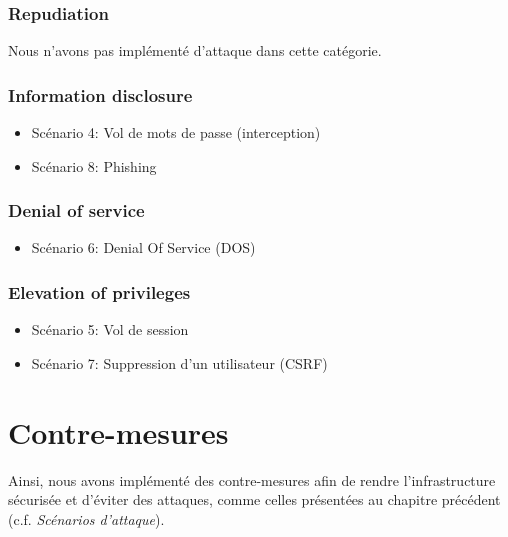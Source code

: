 \documentclass[a4paper,10pt]{article}
\begin{document}
    \subsubsection*{Repudiation}
     Nous n'avons pas implémenté d'attaque dans cette catégorie.
    \subsubsection*{Information disclosure}
    \begin{onehalfspacing}
    \begin{itemize}
     \item Scénario 4: Vol de mots de passe (interception)
     \item Scénario 8: Phishing
    \end{itemize}
    \end{onehalfspacing}
    \subsubsection*{Denial of service}
    \begin{onehalfspacing}
    \begin{itemize}
     \item Scénario 6: Denial Of Service (DOS)
    \end{itemize}
    \end{onehalfspacing}
    \subsubsection*{Elevation of privileges}
    \begin{onehalfspacing}
    \begin{itemize}
     \item Scénario 5: Vol de session
     \item Scénario 7: Suppression d'un utilisateur (CSRF)
    \end{itemize}
    \end{onehalfspacing}
    \section*{Contre-mesures}    
    
    Ainsi, nous avons implémenté des contre-mesures afin de rendre l'infrastructure sécurisée et d'éviter des attaques, comme celles présentées au chapitre précédent (c.f. \textit{Scénarios d'attaque}).
\end{document}
